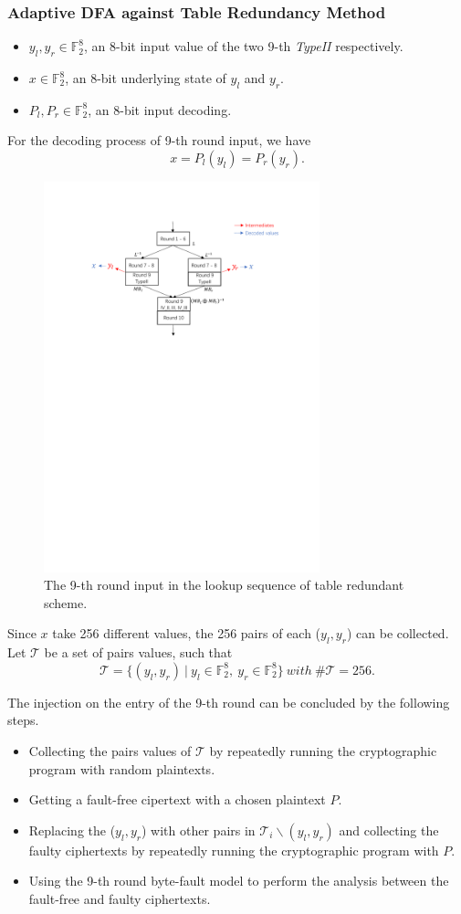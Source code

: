 \documentclass{beamer}
\begin{document}
\frame
{
	\frametitle{Adaptive DFA against Table Redundancy Method}
	\begin{itemize}
		\item $y_{l}, y_{r} \in \mathbb{F}_{2}^{8}$, an 8-bit input value of the two 9-th \textit{TypeII} respectively.
		\item $x \in \mathbb{F}_{2}^{8}$, an 8-bit underlying state of $y_{l}$ and $y_{r}$.
		\item $P_{l}, P_{r} \in \mathbb{F}_{2}^{8}$, an 8-bit input decoding.
	\end{itemize}
	For the decoding process of 9-th round input, we have
	\[x = P_{l}(y_{l}) = P_{r}(y_{r}).\]
}

\frame
{
	\begin{figure}
		\centering
		\includegraphics[width=8cm]{./pics/TRS2.pdf}
		\caption{The 9-th round input in the lookup sequence of table redundant scheme.}
	\end{figure}
}

\frame
{
	Since $x$ take 256 different values, the 256 pairs of each ($y_{l},y_{r}$) can be collected. 
	\\[2ex]
	Let $\mathcal{T}$ be a set of pairs values, such that
	\[\mathcal{T}=\{(y_{l},y_{r})\ |\ y_{l} \in \mathbb{F}_{2}^{8},\ y_{r} \in \mathbb{F}_{2}^{8}\}\ with\ \#\mathcal{T}=256.\]
}

\frame
{
	The injection on the entry of the 9-th round can be concluded by the following steps.
	\begin{itemize}
		\item Collecting the pairs values of $\mathcal{T}$ by repeatedly running the cryptographic program with random plaintexts.
		\item Getting a fault-free cipertext with a chosen plaintext $P$.
		\item Replacing the ($y_{l},y_{r}$) with other pairs in $\mathcal{T}_{i}\backslash(y_{l},y_{r})$ and collecting the faulty ciphertexts by repeatedly running the cryptographic program with $P$.
		\item Using the 9-th round byte-fault model to perform the analysis between the fault-free and faulty ciphertexts.
	\end{itemize}
}
\end{document}
